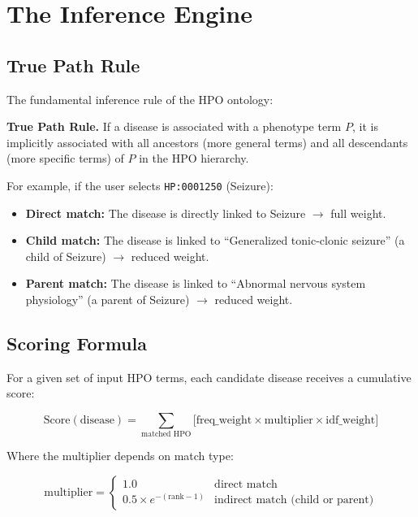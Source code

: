 \documentclass[11pt,a4paper]{article}
\begin{document}
\newpage

\section{The Inference Engine}

\subsection{True Path Rule}

The fundamental inference rule of the HPO ontology:

\begin{callout}
\textbf{True Path Rule.} If a disease is associated with a phenotype term $P$, it is implicitly associated with all ancestors (more general terms) and all descendants (more specific terms) of $P$ in the HPO hierarchy.
\end{callout}

For example, if the user selects \texttt{HP:0001250} (Seizure):
\begin{itemize}[leftmargin=*]
  \item \textbf{Direct match:} The disease is directly linked to Seizure $\rightarrow$ full weight.
  \item \textbf{Child match:} The disease is linked to ``Generalized tonic-clonic seizure'' (a child of Seizure) $\rightarrow$ reduced weight.
  \item \textbf{Parent match:} The disease is linked to ``Abnormal nervous system physiology'' (a parent of Seizure) $\rightarrow$ reduced weight.
\end{itemize}

\subsection{Scoring Formula}

For a given set of input HPO terms, each candidate disease receives a cumulative score:

\begin{equation}
\text{Score}(\text{disease}) = \sum_{\text{matched HPO}} \Big[ \text{freq\_weight} \times \text{multiplier} \times \text{idf\_weight} \Big]
\end{equation}

Where the multiplier depends on match type:

\begin{equation}
\text{multiplier} = \begin{cases}
1.0 & \text{direct match} \\[4pt]
0.5 \times e^{-(\text{rank}-1)} & \text{indirect match (child or parent)}
\end{cases}
\end{equation}
\end{document}

